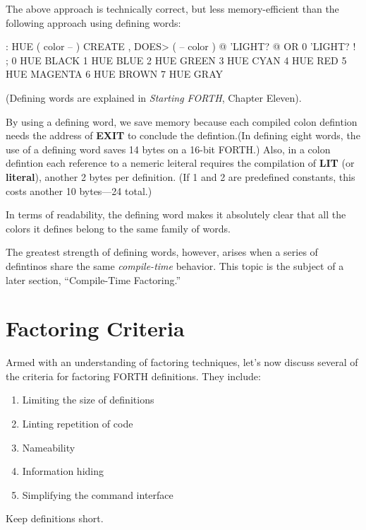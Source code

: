 \noindent The above approach is technically correct, but less memory-efficient than the following approach using defining words:

\begin{Code}
: HUE   ( color -- )  CREATE ,
   DOES>  ( -- color )  @ 'LIGHT? @  OR  0 'LIGHT? ! ;
 0 HUE BLACK         1 HUE BLUE          2 HUE GREEN
 3 HUE CYAN          4 HUE RED           5 HUE MAGENTA
 6 HUE BROWN         7 HUE GRAY
\end{Code}

\noindent 
(Defining words are explained in \emph{Starting FORTH}, Chapter Eleven).

By using a defining word, we save memory because each compiled colon
defintion needs the address of \textbf{EXIT} to conclude the
defintion.(In defining eight words, the use of a defining word saves
14 bytes on a 16-bit FORTH.) Also, in a colon defintion each reference
to a nemeric leiteral requires the compilation of \textbf{LIT} (or
\textbf{literal}), another 2 bytes per definition. (If 1 and 2 are
predefined constants, this costs another 10 bytes---24 total.)

In terms of readability, the defining word makes it absolutely clear that all the colors it defines belong to the same family of words.

The greatest strength of defining words, however, arises when a series of defintinos share the same \emph{compile-time} behavior. This topic is the subject of a later section, ``Compile-Time Factoring.''

\section{Factoring Criteria}
Armed with an understanding of factoring techniques, let's now discuss several of the criteria for factoring FORTH definitions. They include:

\begin{enumerate}
\item Limiting the size of definitions
\item Linting repetition of code
\item Nameability
\item Information hiding
\item Simplifying the command interface
\end{enumerate}

\begin{tip}
Keep definitions short.
\end{tip}

